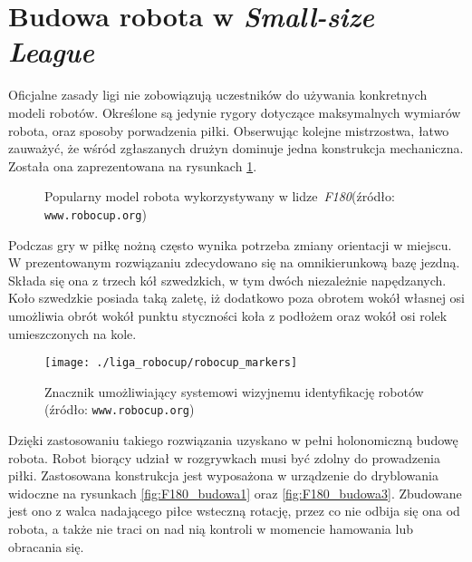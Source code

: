 \section{Budowa robota \label{sec:budowa_robota} w \emph{Small-size League}}
	Oficjalne zasady ligi nie zobowiązują uczestników do używania konkretnych modeli robotów. Określone są jedynie rygory dotyczące maksymalnych wymiarów robota, oraz sposoby porwadzenia piłki.
	Obserwując kolejne mistrzostwa, łatwo zauważyć, że wśród zgłaszanych drużyn dominuje jedna konstrukcja mechaniczna. Została ona zaprezentowana na  rysunkach \ref{fig:F180_budowa}.
 	\begin{figure}
	\centering
	\caption{Popularny model robota wykorzystywany w \mbox{lidze \emph{F180}}\newline(źródło: \texttt{www.robocup.org}) }
	\label{fig:F180_budowa}
	\end{figure}
	Podczas gry w piłkę nożną często wynika potrzeba zmiany orientacji w miejscu. W prezentowanym rozwiązaniu
	zdecydowano się na omnikierunkową bazę jezdną. Składa się ona z trzech kół szwedzkich, w tym dwóch niezależnie
	napędzanych. Koło szwedzkie posiada taką zaletę, iż dodatkowo poza obrotem wokół własnej osi umożliwia obrót
	wokół punktu styczności koła z podłożem oraz wokół osi rolek umieszczonych na kole.
	\begin{wrapfigure}{r}{0.42\textwidth}
	\vspace{-20pt}
	\begin{center}	
	\texttt{[image: ./liga\_robocup/robocup\_markers]}
	\end{center}
	\caption{Znacznik umożliwiający systemowi wizyjnemu identyfikację robotów \newline(źródło: \texttt{www.robocup.org})\label{fig:znacznik}}
	\vspace{-60pt}
	\end{wrapfigure}
	Dzięki zastosowaniu takiego rozwiązania uzyskano w pełni holonomiczną budowę robota.
	Robot biorący udział w rozgrywkach musi być zdolny do prowadzenia piłki. Zastosowana konstrukcja jest wyposażona w urządzenie do dryblowania widoczne na rysunkach \ref{fig:F180_budowa1} oraz \ref{fig:F180_budowa3}. 
	Zbudowane jest ono z walca nadającego piłce wsteczną rotację, przez co nie odbija się ona od robota, a także nie traci on nad nią kontroli w momencie hamowania lub obracania się.
	
